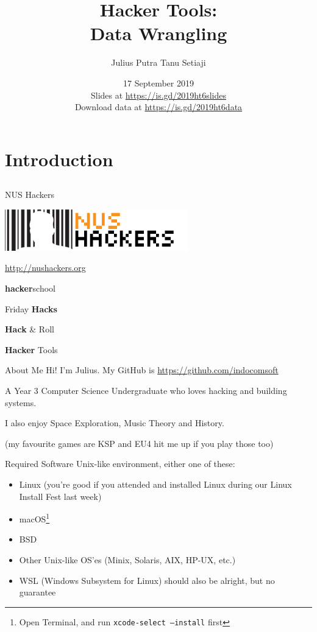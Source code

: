 \documentclass[12pt]{beamer}
\title{Hacker Tools: \\Data Wrangling}
\author{Julius Putra Tanu Setiaji}
\date{17 September 2019 \\ Slides at \url{https://is.gd/2019ht6slides} \\ Download data at \url{https://is.gd/2019ht6data}}
\begin{document}
\frame[plain]{\titlepage}

\section{Introduction}
\subsection{}

\begin{frame}{NUS Hackers}

  \begin{center}
    \includegraphics[width=0.5\linewidth]{../NUSHackers}

    \url{http://nushackers.org}
  \end{center}

  \begin{center}
    \textbf{hacker}school

    Friday \textbf{Hacks}

    \textbf{Hack} \& Roll

    \textbf{Hacker} Tools
  \end{center}

\end{frame}

\begin{frame}{About Me}
  Hi! I'm Julius. My GitHub is \url{https://github.com/indocomsoft}

  A Year 3 Computer Science Undergraduate who loves hacking and building systems.

  I also enjoy Space Exploration, Music Theory and History.

    {\tiny (my favourite games are KSP and EU4 hit me up if you play those too)}
\end{frame}

\begin{frame}{Required Software}
  Unix-like environment, either one of these:
  \begin{itemize}
    \item Linux (you're good if you attended and installed Linux during our Linux Install Fest last week)
    \item macOS\footnote{Open Terminal, and run \texttt{xcode-select --install} first}
    \item BSD
    \item Other Unix-like OS'es (Minix, Solaris, AIX, HP-UX, etc.)
    \item WSL (Windows Subsystem for Linux) should also be alright, but no guarantee
  \end{itemize}
\end{frame}
\end{document}
